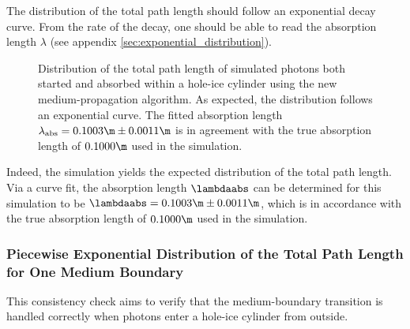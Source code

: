 
The distribution of the total path length should follow an exponential decay curve. From the rate of the decay, one should be able to read the absorption length $\lambda$ (see appendix \ref{sec:exponential_distribution}).

\begin{figure}[htb]
  \caption{Distribution of the total path length of simulated photons both started and absorbed within a hole-ice cylinder using the new medium-propagation algorithm. As expected, the distribution follows an exponential curve. The fitted absorption length $\lambda_\text{abs}=0.1003\m \pm 0.0011\m$ is in agreement with the true absorption length of $0.1000\m$ used in the simulation.}
\end{figure}


Indeed, the simulation yields the expected distribution of the total path length. Via a curve fit, the absorption length $\lambdaabs$ can be determined for this simulation to be $\lambdaabs = 0.1003\m \pm 0.0011\m$, which is in accordance with the true absorption length of $0.1000\m$ used in the simulation.



\subsubsection{Piecewise Exponential Distribution of the Total Path Length for One Medium Boundary}


This consistency check aims to verify that the medium-boundary transition is handled correctly when photons enter a hole-ice cylinder from outside.


